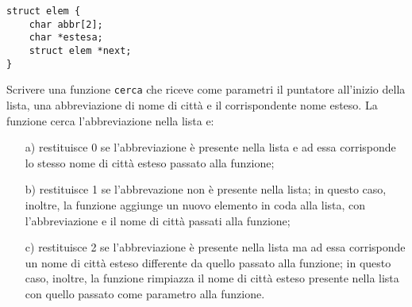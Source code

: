 \documentclass[12pt]{article}
\begin{document}
\begin{lstlisting}
struct elem {
	char abbr[2];
	char *estesa;
	struct elem *next;
}
\end{lstlisting}

Scrivere una funzione \texttt{cerca} che riceve come parametri il puntatore all'inizio della lista, una abbreviazione di nome di citt\`a e  il corrispondente nome esteso. La funzione cerca l'abbreviazione nella lista e:

\begin{enumerate}
\item[a)] restituisce 0 se l'abbreviazione \`e presente nella lista e ad essa corrisponde
  lo stesso nome di citt\`a esteso passato alla funzione;
\item[b)] restituisce 1 se l'abbrevazione non \`e presente nella lista; in questo caso, inoltre,
  la funzione aggiunge un nuovo elemento in coda alla lista, con l'abbreviazione e il nome di citt\`a passati alla funzione;
\item[c)] restituisce 2 se l'abbreviazione \`e presente nella lista ma ad essa corrisponde un nome di citt\`a esteso differente
  da quello passato alla funzione; in questo caso, inoltre, la funzione rimpiazza il nome di citt\`a esteso presente nella lista
  con quello passato come parametro alla funzione.
\end{enumerate}
\end{document}
